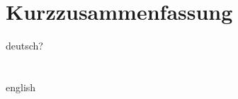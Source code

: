 \chapter*{Kurzzusammenfassung} 

deutsch?\\
\let\oldcleardoublepage\cleardoublepage
\renewcommand\cleardoublepage{}

\chapter*{\abstractname}%

english\\
\let\cleardoublepage\oldcleardoublepage
\newpage
